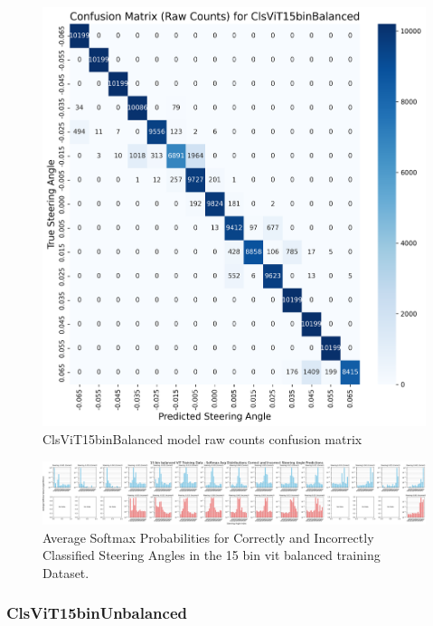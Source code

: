 \begin{figure}[H]
\centering
\includegraphics[width=1\linewidth]{Figures/Results/cm_raw_ClsViT15binBalanced.png}
\caption{ClsViT15binBalanced model raw counts confusion matrix}
\label{fig:cm_raw_ClsViT15binBalanced}
\end{figure}

\begin{figure}[H]
    \centering
    \includegraphics[width=1\linewidth]{Figures/Results/15_bins_vit_softmax_dist_plot_balanced.png}
    \caption{Average Softmax Probabilities for Correctly and Incorrectly Classified Steering Angles in the 15 bin vit balanced training Dataset.}
    \label{fig:15_bins_vit_softmax_dist_balanced}
\end{figure}


\subsubsection{ClsViT15binUnbalanced}

